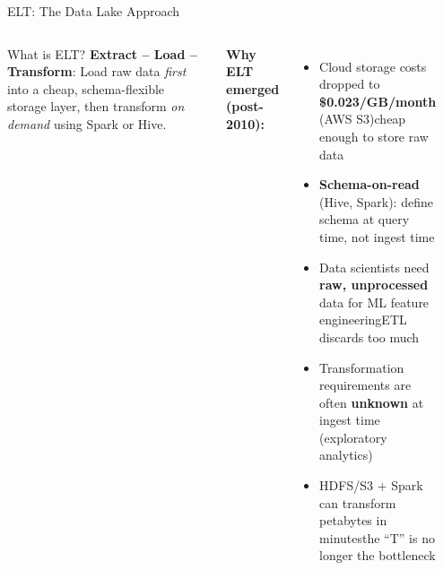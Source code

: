 \documentclass[aspectratio=169,10pt]{beamer}
\begin{document}
\begin{frame}{ELT: The Data Lake Approach}
  \begin{columns}[T]
      \begin{block}{What is ELT?}
        \textbf{Extract -- Load -- Transform}: Load raw data \emph{first} into a cheap, schema-flexible storage layer, then transform \emph{on demand} using Spark or Hive.
      \end{block}
      \vspace{6pt}
      \textbf{Why ELT emerged (post-2010):}
      \begin{itemize}
        \item Cloud storage costs dropped to \textbf{\$0.023/GB/month} (AWS S3)\textemdash cheap enough to store raw data
        \item \textbf{Schema-on-read} (Hive, Spark): define schema at query time, not ingest time
        \item Data scientists need \textbf{raw, unprocessed} data for ML feature engineering\textemdash ETL discards too much
        \item Transformation requirements are often \textbf{unknown} at ingest time (exploratory analytics)
        \item HDFS/S3 + Spark can transform petabytes in minutes\textemdash the ``T'' is no longer the bottleneck
      \end{itemize}

      \begin{center}
\end{center}
\end{columns}
\end{frame}
\end{document}
